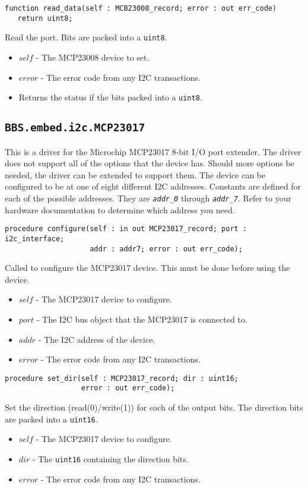 \documentclass[10pt, openany]{book}
\newcommand{\package}[1]{\texttt{#1}}
\newcommand{\constant}[1]{\emph{\texttt{#1}}}
\newcommand{\datatype}[1]{\texttt{#1}}
\begin{document}
\begin{lstlisting}
function read_data(self : MCB23008_record; error : out err_code)
   return uint8;
\end{lstlisting}
Read the port.  Bits are packed into a \datatype{uint8}.
\begin{itemize}
  \item $self$ - The MCP23008 device to set.
  \item $error$ - The error code from any I2C transactions.
  \item Returns the status if the bits packed into a \datatype{uint8}.
\end{itemize}

\subsection{\package{BBS.embed.i2c.MCP23017}}
This is a driver for the Microchip MCP23017 8-bit I/O port extender\cite{MCP23017}.  The driver does not support all of the options that the device has.  Should more options be needed, the driver can be extended to support them.  The device can be configured to be at one of eight different I2C addresses.  Constants are defined for each of the possible addresses.  They are \constant{addr\_0} through \constant{addr\_7}.  Refer to your hardware documentation to determine which address you need.

\begin{lstlisting}
procedure configure(self : in out MCP23017_record; port : i2c_interface;
                    addr : addr7; error : out err_code);
\end{lstlisting}
Called to configure the MCP23017 device.  This must be done before using the device.
\begin{itemize}
  \item $self$ - The MCP23017 device to configure.
  \item $port$ - The I2C bus object that the MCP23017 is connected to.
  \item $addr$ - The I2C address of the device.
  \item $error$ - The error code from any I2C transactions.
\end{itemize}

\begin{lstlisting}
procedure set_dir(self : MCP23017_record; dir : uint16;
                  error : out err_code);
\end{lstlisting}
Set the direction (read(0)/write(1)) for each of the output bits.  The direction bits are packed into a \datatype{uint16}.
\begin{itemize}
  \item $self$ - The MCP23017 device to configure.
  \item $dir$ - The \datatype{uint16} containing the direction bits.
  \item $error$ - The error code from any I2C transactions.
\end{itemize}
\end{document}

